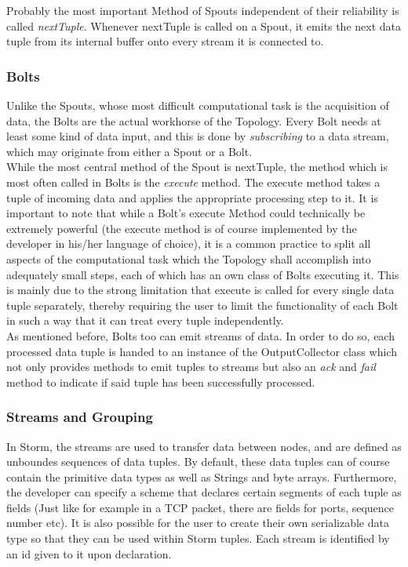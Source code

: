 \documentclass[12pt,a4paper]{article}
\begin{document}
Probably the most important Method of Spouts independent of their reliability is called \textit{nextTuple}. Whenever nextTuple is called on a Spout, it emits the next data tuple from its internal buffer onto every stream it is connected to.

\subsubsection{Bolts}

Unlike the Spouts, whose most difficult computational task is the acquisition of data, the Bolts are the actual workhorse of the Topology. Every Bolt needs at least some kind of data input, and this is done by \textit{subscribing} to a data stream, which may originate from either a Spout or a Bolt.\\

While the most central method of the Spout is nextTuple, the method which is most often called in Bolts is the \textit{execute} method. The execute method takes a tuple of incoming data and applies the appropriate processing step to it. It is important to note that while a Bolt's execute Method could technically be extremely powerful (the execute method is of course implemented by the developer in his/her language of choice), it is a common practice to split all aspects of the computational task which the Topology shall accomplish into adequately small steps, each of which has an own class of Bolts executing it. This is mainly due to the strong limitation that execute is called for every single data tuple separately, thereby requiring the user to limit the functionality of each Bolt in such a way that it can treat every tuple independently.\\

As mentioned before, Bolts too can emit streams of data. In order to do so, each processed data tuple is handed to an instance of the OutputCollector class which not only provides methods to emit tuples to streams but also an \textit{ack} and \textit{fail} method to indicate if said tuple has been successfully processed.

\subsubsection{Streams and Grouping}

In Storm, the streams are used to transfer data between nodes, and are defined as unboundes sequences of data tuples. By default, these data tuples can of course contain the primitive data types as well as Strings and byte arrays. Furthermore, the developer can specify a scheme that declares certain segments of each tuple as fields (Just like for example in a TCP packet, there are fields for ports, sequence number etc). It is also possible for the user to create their own serializable data type so that they can be used within Storm tuples. Each stream is identified by an id given to it upon declaration.\\
\end{document}

